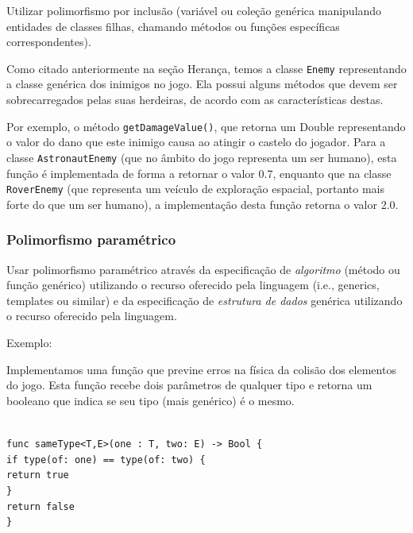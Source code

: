\documentclass[rel_mlp]{iiufrgs}
\newcommand\tab[1][1cm]{\hspace*{#1}}
\begin{document}
Utilizar polimorfismo por inclusão (variável ou coleção genérica manipulando entidades de classes filhas, chamando métodos ou funções específicas correspondentes).

Como citado anteriormente na seção Herança, temos a classe \texttt{Enemy} representando a classe genérica dos inimigos no jogo. Ela possui alguns métodos que devem ser sobrecarregados pelas suas herdeiras, de acordo com as características destas.

Por exemplo, o método \texttt{getDamageValue()}, que retorna um Double representando o valor do dano que este inimigo causa ao atingir o castelo do jogador. Para a classe \texttt{AstronautEnemy} (que no âmbito do jogo representa um ser humano), esta função é implementada de forma a retornar o valor 0.7, enquanto que na classe \texttt{RoverEnemy} (que representa um veículo de exploração espacial, portanto mais forte do que um ser humano), a implementação desta função retorna o valor 2.0.


\subsubsection{Polimorfismo paramétrico}

Usar polimorfismo paramétrico através da especificação de \textit{algoritmo} (método ou função genérico) utilizando o recurso oferecido pela linguagem (i.e., generics, templates ou similar) e da especificação de \textit{estrutura de dados} genérica utilizando o recurso oferecido pela linguagem.

Exemplo:

Implementamos uma função que previne erros na física da colisão dos elementos do jogo. Esta função recebe dois parâmetros de qualquer tipo e retorna um booleano que indica se seu tipo (mais genérico) é o mesmo.

\texttt{\\func sameType<T,E>(one : T, two: E) -> Bool \{\\\tab if type(of: one) == type(of: two) \{\\\tab \tab return true\\\tab\}\\\tab return false\\\}}


\end{document}
